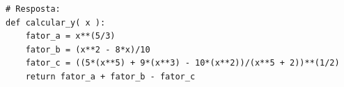 \ifmostrarGabarito
\begin{verbatim}
# Resposta:
def calcular_y( x ):
    fator_a = x**(5/3)
    fator_b = (x**2 - 8*x)/10
    fator_c = ((5*(x**5) + 9*(x**3) - 10*(x**2))/(x**5 + 2))**(1/2)
    return fator_a + fator_b - fator_c
\end{verbatim}
\fi
